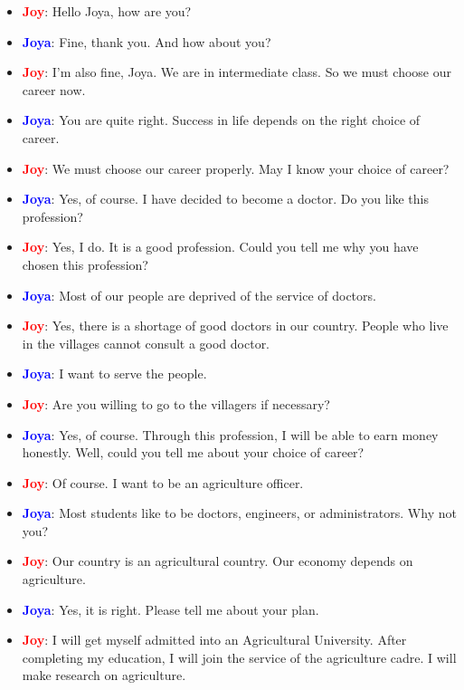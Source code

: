 \documentclass{article}
\begin{document}
\begin{itemize}
    \item \textbf{\textcolor{red}{Joy}}: Hello Joya, how are you?
    \item \textbf{\textcolor{blue}{Joya}}: Fine, thank you. And how about you?
    \item \textbf{\textcolor{red}{Joy}}: I’m also fine, Joya. We are in intermediate class. So we must choose our career now.
    \item \textbf{\textcolor{blue}{Joya}}: You are quite right. Success in life depends on the right choice of career.
    \item \textbf{\textcolor{red}{Joy}}: We must choose our career properly. May I know your choice of career?
    \item \textbf{\textcolor{blue}{Joya}}: Yes, of course. I have decided to become a doctor. Do you like this profession?
    \item \textbf{\textcolor{red}{Joy}}: Yes, I do. It is a good profession. Could you tell me why you have chosen this profession?
    \item \textbf{\textcolor{blue}{Joya}}: Most of our people are deprived of the service of doctors.
    \item \textbf{\textcolor{red}{Joy}}: Yes, there is a shortage of good doctors in our country. People who live in the villages cannot consult a good doctor.
    \item \textbf{\textcolor{blue}{Joya}}: I want to serve the people.
    \item \textbf{\textcolor{red}{Joy}}: Are you willing to go to the villagers if necessary?
    \item \textbf{\textcolor{blue}{Joya}}: Yes, of course. Through this profession, I will be able to earn money honestly. Well, could you tell me about your choice of career?
    \item \textbf{\textcolor{red}{Joy}}: Of course. I want to be an agriculture officer.
    \item \textbf{\textcolor{blue}{Joya}}: Most students like to be doctors, engineers, or administrators. Why not you?
    \item \textbf{\textcolor{red}{Joy}}: Our country is an agricultural country. Our economy depends on agriculture.
    \item \textbf{\textcolor{blue}{Joya}}: Yes, it is right. Please tell me about your plan.
    \item \textbf{\textcolor{red}{Joy}}: I will get myself admitted into an Agricultural University. After completing my education, I will join the service of the agriculture cadre. I will make research on agriculture.

\end{itemize}
\end{document}
